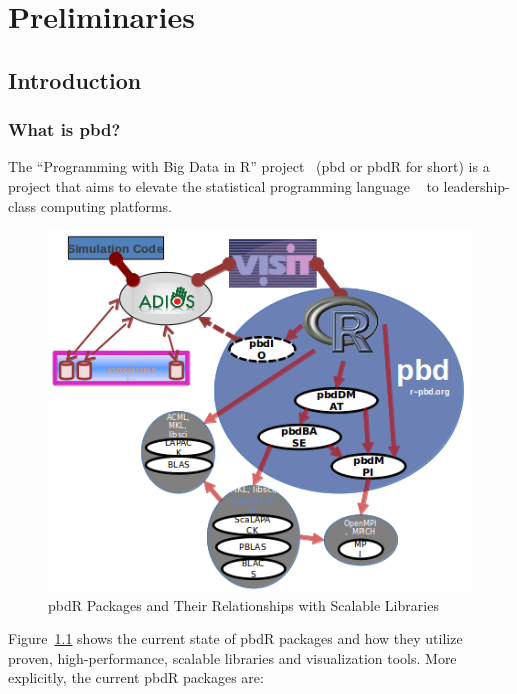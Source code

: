 \part{Preliminaries}




\chapter[Introduction]{Introduction}
\label{sec:introduction}


\section{What is pbd?}

The ``Programming with Big Data in R'' project~\citep{pbdR2012} (pbd or pbdR for short) is a project that aims to elevate the statistical programming language ~\citep{Rcore} to leadership-class computing platforms.  
\begin{figure}[t]
 \centering
 \includegraphics{pbdDEMO-include/pics/pbd}
 \caption{pbdR Packages and Their Relationships with Scalable Libraries}
 \label{fig:pbdrpackages}
\end{figure}
Figure~\ref{fig:pbdrpackages} shows the current state of pbdR packages and how they utilize proven, high-performance, scalable libraries and visualization tools.  More explicitly, the current pbdR packages are:

